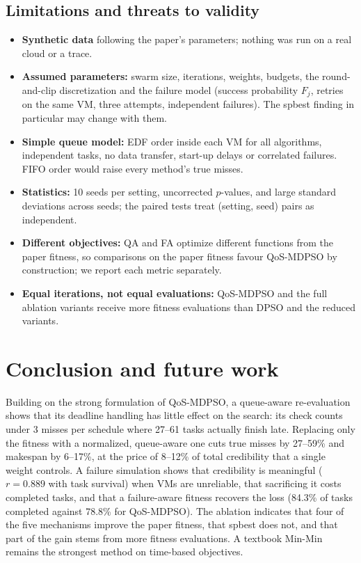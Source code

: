 \documentclass[pdflatex,sn-basic]{sn-jnl}
\theoremstyle{thmstyleone}%
\theoremstyle{thmstyletwo}%
\theoremstyle{thmstylethree}%
\begin{document}
\subsection{Limitations and threats to validity}\label{sec8.1}
\begin{itemize}
\item \textbf{Synthetic data} following the paper's parameters; nothing was run on a real cloud or a trace.
\item \textbf{Assumed parameters:} swarm size, iterations, weights, budgets, the round-and-clip discretization and the failure model (success probability $F_j$, retries on the same VM, three attempts, independent failures). The spbest finding in particular may change with them.
\item \textbf{Simple queue model:} EDF order inside each VM for all algorithms, independent tasks, no data transfer, start-up delays or correlated failures. FIFO order would raise every method's true misses.
\item \textbf{Statistics:} 10 seeds per setting, uncorrected $p$-values, and large standard deviations across seeds; the paired tests treat (setting, seed) pairs as independent.
\item \textbf{Different objectives:} QA and FA optimize different functions from the paper fitness, so comparisons on the paper fitness favour QoS-MDPSO by construction; we report each metric separately.
\item \textbf{Equal iterations, not equal evaluations:} QoS-MDPSO and the full ablation variants receive more fitness evaluations than DPSO and the reduced variants.
\end{itemize}

\section{Conclusion and future work}\label{sec9}
Building on the strong formulation of QoS-MDPSO, a queue-aware re-evaluation shows that its deadline handling has little effect on the search: its check counts under 3 misses per schedule where 27--61 tasks actually finish late. Replacing only the fitness with a normalized, queue-aware one cuts true misses by 27--59\% and makespan by 6--17\%, at the price of 8--12\% of total credibility that a single weight controls. A failure simulation shows that credibility is meaningful ($r=0.889$ with task survival) when VMs are unreliable, that sacrificing it costs completed tasks, and that a failure-aware fitness recovers the loss (84.3\% of tasks completed against 78.8\% for QoS-MDPSO). The ablation indicates that four of the five mechanisms improve the paper fitness, that spbest does not, and that part of the gain stems from more fitness evaluations. A textbook Min-Min remains the strongest method on time-based objectives.
\end{document}
